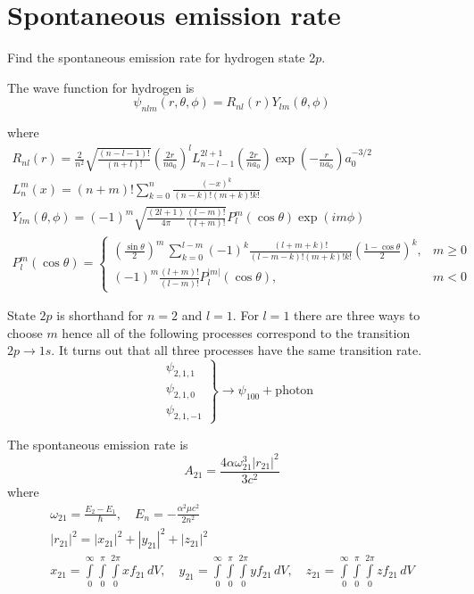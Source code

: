 

\section*{Spontaneous emission rate}

Find the spontaneous emission rate for hydrogen state 2$p$.

\bigskip
The wave function for hydrogen is
\begin{equation*}
\psi_{nlm}(r,\theta,\phi)=R_{nl}(r)Y_{lm}(\theta,\phi)
\end{equation*}

where
\begin{gather*}
R_{nl}(r)=
\frac{2}{n^2}
\sqrt{\frac{(n-l-1)!}{(n+l)!}}
\left(\frac{2r}{na_0}\right)^l
L_{n-l-1}^{2l+1}\left(\frac{2r}{na_0}\right)
\exp\left(-\frac{r}{na_0}\right)
a_0^{-3/2}
\\[1ex]
L_n^m(x)=(n+m)!\sum_{k=0}^n\frac{(-x)^k}{(n-k)!(m+k)!k!}
\\[1ex]
Y_{lm}(\theta,\phi)=(-1)^m
\sqrt{\frac{(2l+1)}{4\pi}
\frac{(l-m)!}{(l+m)!}}
P_l^m(\cos\theta)\exp(im\phi)
\\[1ex]
P_l^m(\cos\theta)=\begin{cases}
\displaystyle
\left(\frac{\sin\theta}{2}\right)^m\,\sum_{k=0}^{l-m}
(-1)^k\frac{(l+m+k)!}{(l-m-k)!(m+k)!k!}
\left(\frac{1-\cos\theta}{2}\right)^k, & m\ge0
\\[3ex]
\displaystyle
(-1)^m\frac{(l+m)!}{(l-m)!}P_l^{|m|}(\cos\theta), & m<0
\end{cases}
\end{gather*}

State $2p$ is shorthand for $n=2$ and $l=1$.
For $l=1$ there are three ways to choose $m$ hence all of the following processes correspond to the transition
$2p\rightarrow1s$.
It turns out that all three processes have the same transition rate.
\begin{equation*}
\left.\begin{aligned}
&\psi_{2,1,1}
\\
&\psi_{2,1,0}
\\
&\psi_{2,1,-1}
\end{aligned}\right\}\rightarrow\psi_{100}+\text{photon}
\end{equation*}

The spontaneous emission rate is
\begin{equation*}
A_{21}=\frac{4\alpha\omega_{21}^3|r_{21}|^2}{3c^2}
\tag{1}
\end{equation*}
where
\begin{gather*}
\omega_{21}=\frac{E_2-E_1}{\hbar},\quad E_n=-\frac{\alpha^2\mu c^2}{2n^2}
\\[1ex]
|r_{21}|^2=|x_{21}|^2+|y_{21}|^2+|z_{21}|^2
\\[1ex]
x_{21}=\int\limits_{0}^{\infty}\int\limits_{0}^{\pi}\int\limits_{0}^{2\pi}xf_{21}\,dV,
\quad
y_{21}=\int\limits_{0}^{\infty}\int\limits_{0}^{\pi}\int\limits_{0}^{2\pi}yf_{21}\,dV,
\quad
z_{21}=\int\limits_{0}^{\infty}\int\limits_{0}^{\pi}\int\limits_{0}^{2\pi}zf_{21}\,dV
\end{gather*}


